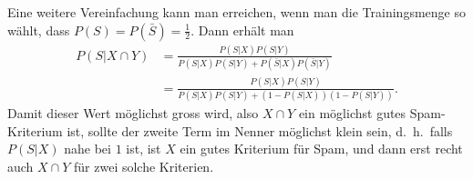 Eine weitere Vereinfachung kann man erreichen, wenn man die Trainingsmenge so
wählt, dass $P(S)=P(\bar S)=\frac12$.
Dann erhält man
\begin{align}
P(S|X\cap Y)
&=
\frac{P(S|X)P(S|Y)}{P(S|X)P(S|Y)+P(\bar S|X)P(\bar S|Y)}\nonumber
\\
&=
\frac{P(S|X)P(S|Y)}{P(S|X)P(S|Y)+(1-P(S|X))(1-P(S|Y))}.
\end{align}
Damit dieser Wert möglichst gross wird, also $X\cap Y$ ein möglichst
gutes Spam-Kriterium ist, sollte der zweite Term im Nenner möglichst klein
sein, d.~h.~falls $P(S|X)$ nahe bei $1$ ist, ist $X$ ein gutes Kriterium für
Spam, und dann erst recht auch $X\cap Y$ für zwei solche Kriterien.
